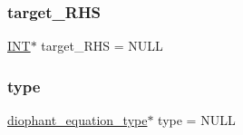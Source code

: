\subsubsection{\texorpdfstring{target\+\_\+\+R\+HS}{target\_RHS}}
{\footnotesize\ttfamily \mbox{\hyperlink{galois_8h_a09fddde158a3a20bd2dcadb609de11dc}{I\+NT}}$\ast$ target\+\_\+\+R\+HS = N\+U\+LL}

\mbox{\label{_l_i_b_2_g_a_l_o_i_s_2dlx_8_c_ad241c8005abf9f323e9fffec67f55abf}} 
\subsubsection{\texorpdfstring{type}{type}}
{\footnotesize\ttfamily \mbox{\hyperlink{galois_8h_a331aa0f3283349b42f6bab83e017cdc1}{diophant\+\_\+equation\+\_\+type}}$\ast$ type = N\+U\+LL}

